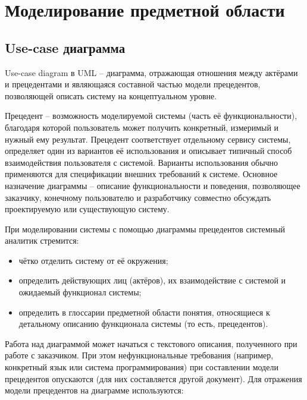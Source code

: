\lstset{style=fsharpstyle}

\section{Моделирование предметной области} 
\label{sec:practice:technology_used}


\subsection{Use-case диаграмма }
\label{sub:practice:microsoft_net}

Use-case diagram в UML – диаграмма, отражающая отношения между актёрами и прецедентами и являющаяся составной частью модели прецедентов, позволяющей описать систему на концептуальном уровне.

Прецедент – возможность моделируемой системы (часть её функциональности), благодаря которой пользователь может получить конкретный, измеримый и нужный ему результат. Прецедент соответствует отдельному сервису системы, определяет один из вариантов её использования и описывает типичный способ взаимодействия пользователя с системой. Варианты использования обычно применяются для спецификации внешних требований к системе. Основное назначение диаграммы – описание функциональности и поведения, позволяющее заказчику, конечному пользователю и разработчику совместно обсуждать проектируемую или существующую систему.

При моделировании системы с помощью диаграммы прецедентов системный аналитик стремится:
\begin{itemize}
  \item чётко отделить систему от её окружения;
  \item определить действующих лиц (актёров), их взаимодействие с системой и ожидаемый функционал системы;
  \item определить в глоссарии предметной области понятия, относящиеся к детальному описанию функционала системы (то есть, прецедентов).
\end{itemize}

Работа над диаграммой может начаться с текстового описания, полученного при работе с заказчиком. При этом нефункциональные требования (например, конкретный язык или система программирования) при составлении модели прецедентов опускаются (для них составляется другой документ).
Для отражения модели прецедентов на диаграмме используются:

